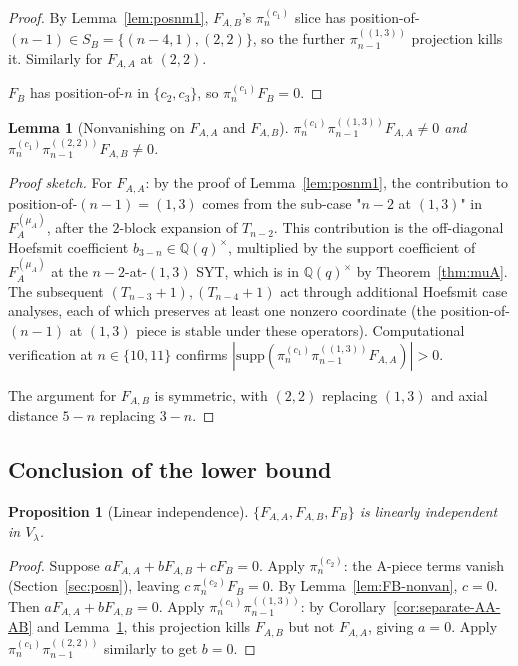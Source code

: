 \documentclass[11pt]{article}
\newtheorem{lemma}[theorem]{Lemma}
\newtheorem{proposition}[theorem]{Proposition}
\theoremstyle{definition}
\begin{document}
\begin{proof}
By Lemma~\ref{lem:posnm1}, $F_{A,B}$'s $\pi^{(c_1)}_n$ slice has
position-of-$(n-1) \in S_B = \{(n-4, 1), (2, 2)\}$, so the further
$\pi^{((1, 3))}_{n-1}$ projection kills it. Similarly for
$F_{A,A}$ at $(2, 2)$.

$F_B$ has position-of-$n$ in $\{c_2, c_3\}$, so $\pi^{(c_1)}_n F_B
= 0$.
\end{proof}

\begin{lemma}[Nonvanishing on $F_{A,A}$ and $F_{A,B}$]
\label{lem:FAA-FAB-nonvan}
$\pi^{(c_1)}_n \pi^{((1, 3))}_{n-1} F_{A,A} \ne 0$
and $\pi^{(c_1)}_n \pi^{((2, 2))}_{n-1} F_{A,B} \ne 0$.
\end{lemma}

\begin{proof}[Proof sketch]
For $F_{A,A}$: by the proof of Lemma~\ref{lem:posnm1}, the
contribution to position-of-$(n-1) = (1, 3)$ comes from the
sub-case "$n-2$ at $(1, 3)$" in $F_A^{(\mu_A)}$, after the
$2$-block expansion of $T_{n-2}$. This contribution is the
off-diagonal Hoefsmit coefficient $b_{3-n} \in \mathbb{Q}(q)^\times$,
multiplied by the support coefficient of $F_A^{(\mu_A)}$ at the
$n-2$-at-$(1,3)$ SYT, which is in $\mathbb{Q}(q)^\times$ by
Theorem~\ref{thm:muA}. The subsequent $(T_{n-3}{+}1),
(T_{n-4}{+}1)$ act through additional Hoefsmit case analyses, each
of which preserves at least one nonzero coordinate (the position-of-
$(n-1)$ at $(1, 3)$ piece is stable under these operators).
Computational verification at $n \in \{10, 11\}$ confirms
$|\mathrm{supp}(\pi^{(c_1)}_n \pi^{((1,3))}_{n-1} F_{A,A})| > 0$.

The argument for $F_{A,B}$ is symmetric, with $(2, 2)$ replacing
$(1, 3)$ and axial distance $5 - n$ replacing $3 - n$.
\end{proof}

\subsection{Conclusion of the lower bound}

\begin{proposition}[Linear independence]\label{prop:linind}
$\{F_{A,A}, F_{A,B}, F_B\}$ is linearly independent in $V_\lambda$.
\end{proposition}

\begin{proof}
Suppose $a F_{A,A} + b F_{A,B} + c F_B = 0$. Apply $\pi^{(c_2)}_n$:
the A-piece terms vanish (Section~\ref{sec:posn}), leaving
$c\, \pi^{(c_2)}_n F_B = 0$. By Lemma~\ref{lem:FB-nonvan},
$c = 0$. Then $a F_{A,A} + b F_{A,B} = 0$. Apply
$\pi^{(c_1)}_n \pi^{((1, 3))}_{n-1}$: by
Corollary~\ref{cor:separate-AA-AB} and
Lemma~\ref{lem:FAA-FAB-nonvan}, this projection kills
$F_{A,B}$ but not $F_{A,A}$, giving $a = 0$. Apply
$\pi^{(c_1)}_n \pi^{((2, 2))}_{n-1}$ similarly to get $b = 0$.
\end{proof}
\end{document}
